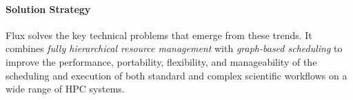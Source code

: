 \paragraph{Solution Strategy}
Flux solves the key technical problems
that emerge from these trends.
It combines {\em fully hierarchical resource management}
with {\em graph-based scheduling} to improve
the performance, portability, flexibility,
and manageability of the scheduling
and execution of both standard and
complex scientific workflows on a wide range of HPC systems.
\begin{figure}[ht]
  \hfill
\end{figure}

